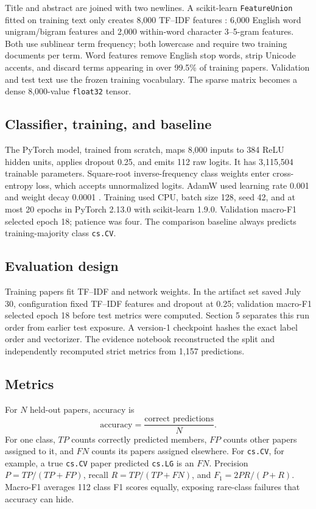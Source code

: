 \documentclass[10pt]{article}
\begin{document}
Title and abstract are joined with two newlines. A scikit-learn
\texttt{FeatureUnion} fitted on training text only creates 8,000 TF--IDF
features \cite{sklearn}: 6,000 English word unigram/bigram features and 2,000
within-word character 3--5-gram features. Both use sublinear term frequency;
both lowercase and require two training documents per term. Word features
remove English stop words, strip Unicode accents, and discard terms appearing
in over 99.5\% of training papers. Validation and test text use the frozen
training vocabulary. The sparse matrix becomes a dense 8,000-value
\texttt{float32} tensor.

\subsection{Classifier, training, and baseline}

The PyTorch model, trained from scratch, maps 8,000 inputs to 384 ReLU hidden
units, applies dropout 0.25, and emits 112 raw logits. It has 3,115,504
trainable parameters. Square-root inverse-frequency class weights enter
cross-entropy loss, which accepts unnormalized logits. AdamW used learning rate
0.001 and weight decay 0.0001 \cite{pytorch}. Training used CPU,
batch size 128, seed 42, and at most 20 epochs in PyTorch 2.13.0 with
scikit-learn 1.9.0. Validation macro-F1 selected epoch 18; patience was four.
The comparison baseline always predicts training-majority class
\texttt{cs.CV}.

\subsection{Evaluation design}

Training papers fit TF--IDF and network weights. In the artifact set saved July 30,
configuration fixed TF--IDF features and dropout at 0.25; validation macro-F1
selected epoch 18 before test metrics were computed. Section 5 separates this
run order from earlier test exposure. A version-1 checkpoint hashes the exact
label order and vectorizer. The evidence notebook reconstructed the split and
independently recomputed strict metrics from 1,157 predictions.

\subsection{Metrics}

For $N$ held-out papers, accuracy is
\[
  \mathrm{accuracy}=\frac{\text{correct predictions}}{N}.
\]
For one class, $TP$ counts correctly predicted members, $FP$ counts other
papers assigned to it, and $FN$ counts its papers assigned elsewhere. For
\texttt{cs.CV}, for example, a true \texttt{cs.CV} paper predicted
\texttt{cs.LG} is an $FN$. Precision $P=TP/(TP+FP)$, recall
$R=TP/(TP+FN)$, and $F_1=2PR/(P+R)$. Macro-F1 averages 112 class F1 scores
equally, exposing rare-class failures that accuracy can hide.
\end{document}
